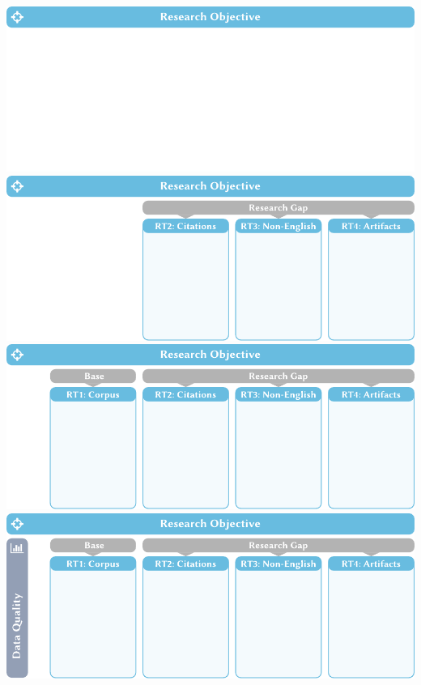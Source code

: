 \documentclass[en,16:9,smallfoot]{sdqbeamer}
\begin{document}
   \begin{frame}[plain]
       \begin{overprint}
            \centering\includegraphics[width=\textwidth]{imgs/objective_grid_and_contrib_0}
            \centering\includegraphics[width=\textwidth]{imgs/objective_grid_and_contrib_1}
            \centering\includegraphics[width=\textwidth]{imgs/objective_grid_and_contrib_2}
            \centering\includegraphics[width=\textwidth]{imgs/objective_grid_and_contrib_3}

\end{overprint}
\end{frame}
\end{document}
